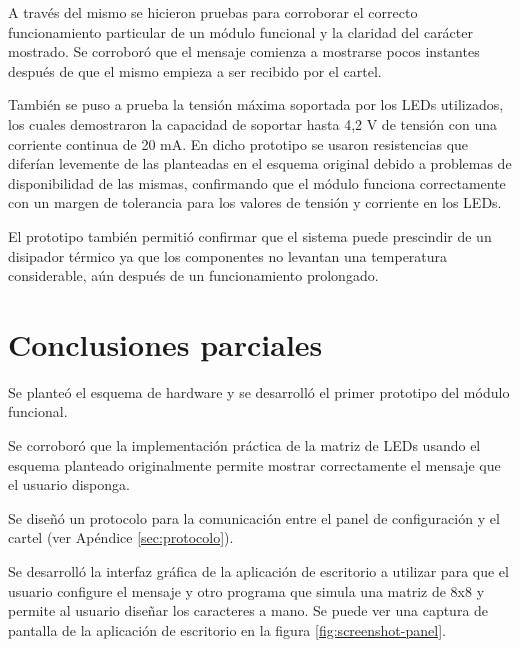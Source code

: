A través del mismo se hicieron pruebas para corroborar el correcto funcionamiento particular de un módulo funcional y la claridad del carácter mostrado. Se corroboró que el mensaje comienza a mostrarse pocos instantes después de que el mismo empieza a ser recibido por el cartel.

También se puso a prueba la tensión máxima soportada por los LEDs utilizados, los cuales demostraron la capacidad de soportar hasta 4,2 V de tensión con una corriente continua de 20 mA. En dicho prototipo se usaron resistencias que diferían levemente de las planteadas en el esquema original debido a problemas de disponibilidad de las mismas, confirmando que el módulo funciona correctamente con un margen de tolerancia para los valores de tensión y corriente en los LEDs.

El prototipo también permitió confirmar que el sistema puede prescindir de un disipador térmico ya que los componentes no levantan una temperatura considerable, aún después de un funcionamiento prolongado.


\section{Conclusiones parciales}

Se planteó el esquema de hardware y se desarrolló el primer prototipo del módulo funcional.

Se corroboró que la implementación práctica de la matriz de LEDs usando el esquema planteado originalmente permite mostrar correctamente el mensaje que el usuario disponga.

Se diseñó un protocolo para la comunicación entre el panel de configuración y el cartel (ver Apéndice  \ref{sec:protocolo}).

Se desarrolló la interfaz gráfica de la aplicación de escritorio a utilizar para que el usuario configure el mensaje y otro programa que simula una matriz de 8x8 y permite al usuario diseñar los caracteres a mano. Se puede ver una captura de pantalla de la aplicación de escritorio en la figura \ref{fig:screenshot-panel}.

